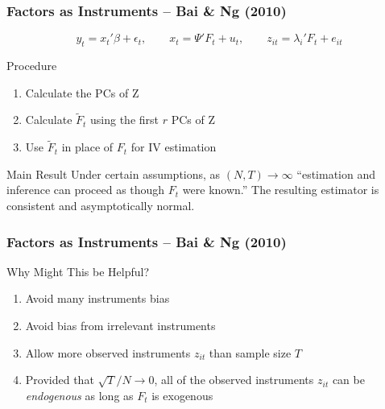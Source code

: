 \documentclass[handout]{beamer}
\begin{document}
\begin{frame}[c]\frametitle{Factors as Instruments -- Bai \& Ng (2010)}

\small

$$\boxed{
	y_t = x_t' \beta + \epsilon_t, \quad \quad
	x_t = \Psi'F_t + u_t, \quad \quad
	z_{it} = \lambda_i' F_t + e_{it}
}$$
\vspace{1em}

\begin{block}
	{Procedure}
	\begin{enumerate}
		\item Calculate the PCs of Z
		\item Calculate $\widetilde{F}_t$ using the first $r$ PCs of Z
		\item Use $\widetilde{F}_t$ in place of $F_t$ for IV estimation
	\end{enumerate}
\end{block}

\begin{block}
	{Main Result}
	Under certain assumptions, as $(N,T) \rightarrow \infty$ ``estimation and inference can proceed as though $F_t$ were known.'' The resulting estimator is consistent and asymptotically normal.
\end{block}

\normalsize

\end{frame}
\begin{frame}[c]\frametitle{Factors as Instruments -- Bai \& Ng (2010)}
    
\begin{block}
	{Why Might This be Helpful?}
	\begin{enumerate}
		\item Avoid many instruments bias
		\item Avoid bias from irrelevant instruments
		\item Allow more observed instruments $z_{it}$ than sample size $T$
		\item Provided that $\sqrt{T}/N \rightarrow 0$, all of the observed instruments $z_{it}$ can be \emph{endogenous} as long as $F_t$ is exogenous
	\end{enumerate}
\end{block}

\end{frame}
\end{document}
